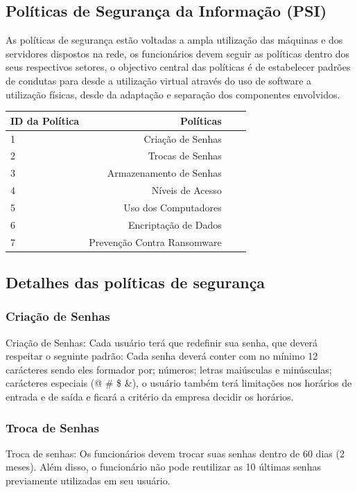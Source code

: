 \documentclass[12pt]{article}
\begin{document}
\subsection{Políticas de Segurança da Informação (PSI)}
As políticas de segurança estão voltadas a ampla utilização das máquinas e dos servidores dispostos na rede, os funcionários devem seguir as políticas dentro dos seus respectivos setores, o objectivo central das políticas é de estabelecer padrões de condutas para desde a utilização virtual através do uso de software a utilização físicas, desde da adaptação e separação dos componentes envolvidos.

\begin{center}
\begin{tabular}{| l | r | r | r |}
\hline 
ID da Política & Políticas\\
\hline
1 & Criação de Senhas\\
2 & Trocas de Senhas\\
3 & Armazenamento de Senhas\\
4 & Níveis de Acesso\\
5 & Uso dos Computadores\\
6 & Encriptação de Dados\\
7 & Prevenção Contra Ransomware\\
\hline
\end{tabular}
\end{center}

\subsection{Detalhes das políticas de segurança}

\subsubsection{Criação de Senhas}
Criação de Senhas: Cada usuário terá que redefinir sua senha, que deverá respeitar o seguinte padrão: Cada senha deverá conter com no mínimo 12 carácteres sendo eles formador por; números; letras maiúsculas e minúsculas; carácteres especiais (@ \# \$ \&), o usuário também terá limitações nos horários de entrada e de saída e ficará a critério da empresa decidir os horários.

\subsubsection{Troca de Senhas}
Troca de senhas: Os funcionários devem trocar suas senhas dentro de 60 dias (2 meses). Além disso, o funcionário não pode reutilizar as 10 últimas senhas previamente utilizadas em seu usuário.
\end{document}
